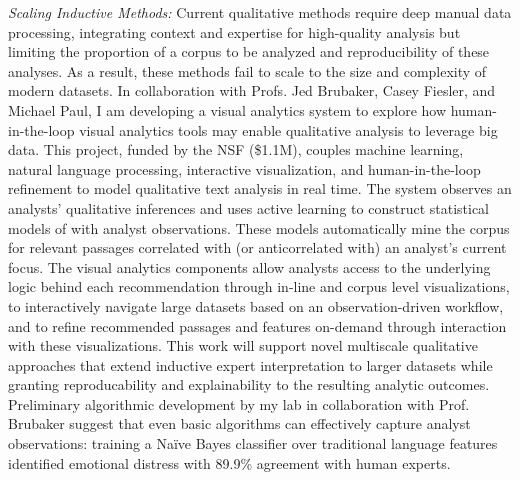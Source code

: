\documentclass[11pt]{article}
\begin{document}
\emph{Scaling Inductive Methods:} Current qualitative methods require deep manual data processing, integrating context and expertise for high-quality analysis but limiting the proportion of a corpus to be analyzed and reproducibility of these analyses. As a result, these methods fail to scale to the size and complexity of modern datasets. 
In collaboration with Profs. Jed Brubaker, Casey Fiesler, and Michael Paul, I am developing a visual analytics system to explore how human-in-the-loop visual analytics tools may enable qualitative analysis to leverage big data.  This project, funded by the NSF (\$1.1M), couples machine learning, natural language processing, interactive visualization, and human-in-the-loop refinement to model qualitative text analysis in real time. The system observes an analysts' qualitative inferences and uses active learning to construct statistical models of with analyst observations. These models automatically mine the corpus for relevant passages correlated with (or anticorrelated with) an analyst's current focus. The visual analytics components allow analysts access to the underlying logic behind each recommendation through in-line and corpus level visualizations, to interactively navigate large datasets based on an observation-driven workflow, and to refine recommended passages and features on-demand through interaction with these visualizations.
This work will support novel multiscale qualitative approaches that extend inductive expert interpretation to larger datasets while granting reproducability and explainability to the resulting analytic outcomes.
Preliminary algorithmic development by my lab in collaboration with Prof. Brubaker suggest that even basic algorithms can effectively capture analyst observations: training a Na\"ive Bayes classifier over traditional language features identified emotional distress with 89.9\% agreement with human experts.
\end{document}
